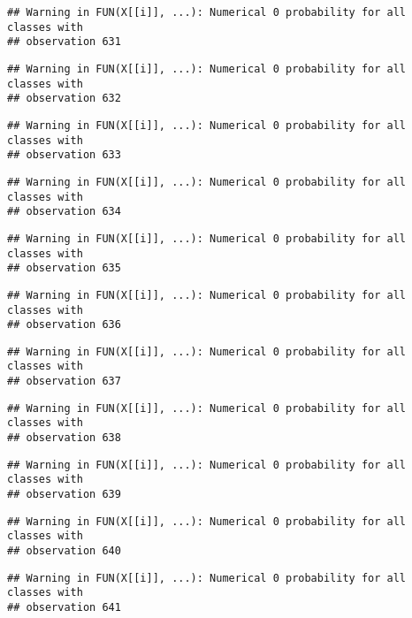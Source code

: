 \documentclass[
]{article}
\begin{document}
\begin{verbatim}
## Warning in FUN(X[[i]], ...): Numerical 0 probability for all classes with
## observation 631
\end{verbatim}

\begin{verbatim}
## Warning in FUN(X[[i]], ...): Numerical 0 probability for all classes with
## observation 632
\end{verbatim}

\begin{verbatim}
## Warning in FUN(X[[i]], ...): Numerical 0 probability for all classes with
## observation 633
\end{verbatim}

\begin{verbatim}
## Warning in FUN(X[[i]], ...): Numerical 0 probability for all classes with
## observation 634
\end{verbatim}

\begin{verbatim}
## Warning in FUN(X[[i]], ...): Numerical 0 probability for all classes with
## observation 635
\end{verbatim}

\begin{verbatim}
## Warning in FUN(X[[i]], ...): Numerical 0 probability for all classes with
## observation 636
\end{verbatim}

\begin{verbatim}
## Warning in FUN(X[[i]], ...): Numerical 0 probability for all classes with
## observation 637
\end{verbatim}

\begin{verbatim}
## Warning in FUN(X[[i]], ...): Numerical 0 probability for all classes with
## observation 638
\end{verbatim}

\begin{verbatim}
## Warning in FUN(X[[i]], ...): Numerical 0 probability for all classes with
## observation 639
\end{verbatim}

\begin{verbatim}
## Warning in FUN(X[[i]], ...): Numerical 0 probability for all classes with
## observation 640
\end{verbatim}

\begin{verbatim}
## Warning in FUN(X[[i]], ...): Numerical 0 probability for all classes with
## observation 641
\end{verbatim}
\end{document}
